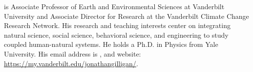 \documentclass{wscpaperproc}\usepackage[]{graphicx}\usepackage[]{color}
\begin{document}
 is Associate Professor of Earth and Environmental Sciences at Vanderbilt University and Associate Director for Research at the Vanderbilt Climate Change Research Network. His research and teaching interests center on integrating natural science, social science, behavioral science, and engineering to study coupled human-natural systems. He holds a  Ph.D. in Physics from Yale University. His email address is , and website: \href{https://my.vanderbilt.edu/jonathangilligan/}{https://my.vanderbilt.edu/jonathangilligan/}.
\end{document}
